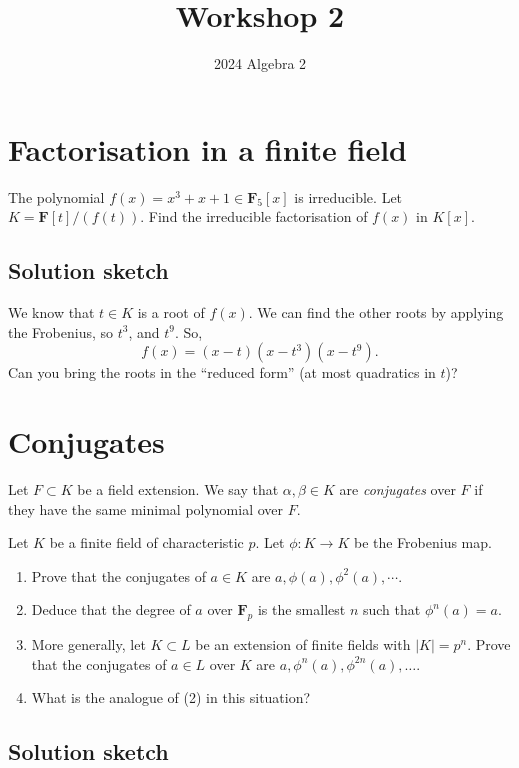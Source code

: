 \documentclass[12pt]{amsart}
\author{2024 Algebra 2}
\date{}
\title{Workshop 2}
\begin{document}
\maketitle
\section{Factorisation in a finite field}
\label{sec:org15d6025}

The polynomial \(f(x) = x^3+x+1 \in \mathbf{F}_5[x]\) is irreducible.
Let \(K = \mathbf{F}[t]/(f(t))\).
Find the irreducible factorisation of \(f(x)\) in \(K[x]\).
\subsection{Solution sketch}
\label{sec:orgdca28cc}

We know that \(t \in K\) is a root of \(f(x)\).
We can find the other roots by applying the Frobenius, so \(t^3\), and \(t^9\).
So,
\[ f(x) = (x-t)(x-t^3)(x-t^9).\]
Can you bring the roots in the ``reduced form'' (at most quadratics in \(t\))?
\section{Conjugates}
\label{sec:orgc382d12}

Let \(F \subset K\) be a field extension.
We say that \(\alpha, \beta \in K\) are \emph{conjugates} over \(F\) if they have the same minimal polynomial over \(F\).

Let \(K\) be a finite field of characteristic \(p\).
Let \(\phi \colon K \to K\) be the Frobenius map.
\begin{enumerate}
\item Prove that the conjugates of \(a \in K\) are \(a, \phi(a), \phi^2(a), \cdots\).
\item Deduce that the degree of \(a\) over \(\mathbf{F}_p\) is the smallest \(n\) such that \(\phi^n(a) = a\).
\item More generally, let \(K \subset L\) be an extension of finite fields with \(|K| = p^n\).
Prove that the conjugates of \(a \in L\) over \(K\) are \(a, \phi^n(a), \phi^{2n}(a), \dots\).
\item What is the analogue of (2) in this situation?
\end{enumerate}
\subsection{Solution sketch}
\label{sec:orgde88230}
\end{document}
